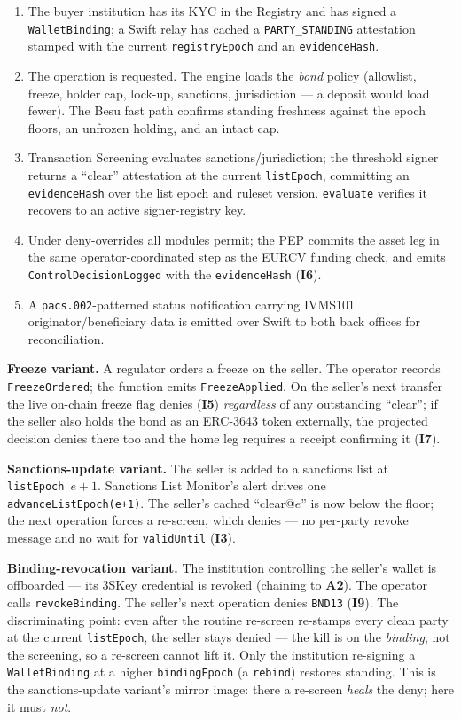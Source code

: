 \documentclass[11pt,a4paper]{article}
\newcommand{\Aref}[1]{\textbf{A#1}}
\newcommand{\Iref}[1]{\textbf{I#1}}
\begin{document}
\begin{enumerate}[leftmargin=1.5em,itemsep=2pt]
  \item The buyer institution has its KYC in the Registry and has signed a
  \texttt{WalletBinding}; a Swift relay has cached a \texttt{PARTY\_STANDING}
  attestation stamped with the current \texttt{registryEpoch} and an
  \texttt{evidenceHash}.
  \item The operation is requested. The engine loads the \emph{bond} policy
  (allowlist, freeze, holder cap, lock-up, sanctions, jurisdiction --- a deposit
  would load fewer). The Besu fast path confirms standing freshness against the
  epoch floors, an unfrozen holding, and an intact cap.
  \item Transaction Screening evaluates sanctions/jurisdiction; the threshold
  signer returns a ``clear'' attestation at the current \texttt{listEpoch},
  committing an \texttt{evidenceHash} over the list epoch and ruleset version.
  \texttt{evaluate} verifies it recovers to an active signer-registry key.
  \item Under deny-overrides all modules permit; the PEP commits the asset leg in
  the same operator-coordinated step as the EURCV funding check, and emits
  \texttt{ControlDecisionLogged} with the \texttt{evidenceHash} (\Iref{6}).
  \item A \texttt{pacs.002}-patterned status notification carrying IVMS101
  originator/beneficiary data is emitted over Swift to both back offices for
  reconciliation.
\end{enumerate}

\noindent
\textbf{Freeze variant.} A regulator orders a freeze on the seller. The operator
records \texttt{FreezeOrdered}; the function emits \texttt{FreezeApplied}. On the
seller's next transfer the live on-chain freeze flag denies (\Iref{5})
\emph{regardless} of any outstanding ``clear''; if the seller also holds the bond
as an ERC-3643 token externally, the projected decision denies there too and the
home leg requires a receipt confirming it (\Iref{7}).

\noindent
\textbf{Sanctions-update variant.} The seller is added to a sanctions list at
\texttt{listEpoch}~$e+1$. Sanctions List Monitor's alert drives one
\texttt{advanceListEpoch(e+1)}. The seller's cached ``clear@$e$'' is now below the
floor; the next operation forces a re-screen, which denies --- no per-party revoke
message and no wait for \texttt{validUntil} (\Iref{3}).

\noindent
\textbf{Binding-revocation variant.} The institution controlling the seller's
wallet is offboarded --- its 3SKey credential is revoked (chaining to \Aref{2}).
The operator calls \texttt{revokeBinding}. The seller's next operation denies
\texttt{BND13} (\Iref{9}). The discriminating point: even after the routine
re-screen re-stamps every clean party at the current \texttt{listEpoch}, the
seller stays denied --- the kill is on the \emph{binding}, not the screening, so a
re-screen cannot lift it. Only the institution re-signing a \texttt{WalletBinding}
at a higher \texttt{bindingEpoch} (a \texttt{rebind}) restores standing. This is
the sanctions-update variant's mirror image: there a re-screen \emph{heals} the
deny; here it must \emph{not}.
\end{document}
